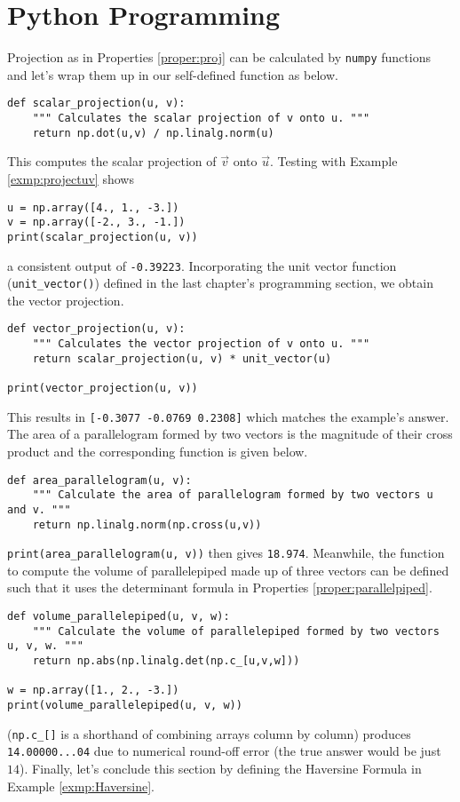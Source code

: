 \section{Python Programming}
Projection as in Properties \ref{proper:proj} can be calculated by \verb|numpy| functions and let's wrap them up in our self-defined function as below.
\begin{lstlisting}
def scalar_projection(u, v):
    """ Calculates the scalar projection of v onto u. """
    return np.dot(u,v) / np.linalg.norm(u)
\end{lstlisting}
This computes the scalar projection of $\vec{v}$ onto $\vec{u}$. Testing with Example \ref{exmp:projectuv} shows 
\begin{lstlisting}
u = np.array([4., 1., -3.])
v = np.array([-2., 3., -1.])
print(scalar_projection(u, v))
\end{lstlisting}
a consistent output of \texttt{-0.39223}. Incorporating the unit vector function (\verb|unit_vector()|) defined in the last chapter's programming section, we obtain the vector projection.
\begin{lstlisting}
def vector_projection(u, v):
    """ Calculates the vector projection of v onto u. """
    return scalar_projection(u, v) * unit_vector(u)

print(vector_projection(u, v))
\end{lstlisting}
This results in \texttt{[-0.3077 -0.0769  0.2308]} which matches the example's answer. The area of a parallelogram formed by two vectors is the magnitude of their cross product and the corresponding function is given below.
\begin{lstlisting}
def area_parallelogram(u, v):
    """ Calculate the area of parallelogram formed by two vectors u and v. """
    return np.linalg.norm(np.cross(u,v))
\end{lstlisting}
\verb|print(area_parallelogram(u, v))| then gives \texttt{18.974}. Meanwhile, the function to compute the volume of parallelepiped made up of three vectors can be defined such that it uses the determinant formula in Properties \ref{proper:parallelpiped}.
\begin{lstlisting}
def volume_parallelepiped(u, v, w):
    """ Calculate the volume of parallelepiped formed by two vectors u, v, w. """
    return np.abs(np.linalg.det(np.c_[u,v,w]))

w = np.array([1., 2., -3.])
print(volume_parallelepiped(u, v, w))
\end{lstlisting}
(\verb|np.c_[]| is a shorthand of combining arrays column by column) produces \texttt{14.00000...04} due to numerical round-off error (the true answer would be just $14$). Finally, let's conclude this section by defining the Haversine Formula in Example \ref{exmp:Haversine}.
